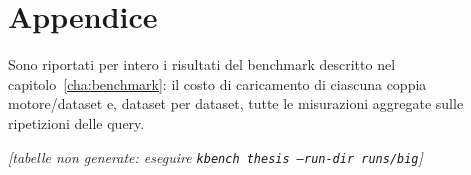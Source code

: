 \chapter{Appendice}
\label{cha:attachment}

Sono riportati per intero i risultati del benchmark descritto nel
capitolo~\ref{cha:benchmark}: il costo di caricamento di ciascuna coppia motore/dataset e,
dataset per dataset, tutte le misurazioni aggregate sulle ripetizioni delle query.

  {\textit{[tabelle non generate: eseguire \texttt{kbench thesis --run-dir runs/big}]}}
